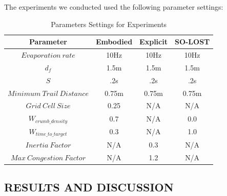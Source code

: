 \documentclass[letterpaper, 10 pt, conference]{ieeeconf}  %
\begin{document}
The experiments we conducted used the following parameter settings:

\begin{table}[ht]                                                              
  \begin{center}
    \begin{tabular}{|c|c|c|c|}                                                
    \hline
      Parameter & Embodied & Explicit & SO-LOST\\                                  
    \hline                                                                    
      $Evaporation\ rate$ & 10Hz & 10Hz & 10Hz\\ %
    \hline
      $d_f$ & 1.5m & 1.5m & 1.5m\\ %
    \hline
      $S$ & .2s & .2s & .2s\\ %
    \hline
      $Minimum\ Trail\ Distance$ & 0.75m & 0.75m & 0.75m\\ %
    \hline
      $Grid\ Cell\ Size$ & 0.25 & N/A & N/A\\ %
    \hline
      $W_{crumb\_density}$ & 0.7 & N/A & 0.0\\ %
    \hline
      $W_{time\_to\_target}$ & 0.3 & N/A & 1.0\\ %
    \hline
      $Inertia\ Factor$ & N/A & 0.3 & N/A\\ %
    \hline
      $Max\ Congestion\ Factor$ & N/A & 1.2 & N/A\\ %
    \hline
    \end{tabular}
   \caption{Parameters Settings for Experiments}                                
    \label{table:parameter_settings}
  \end{center}
\end{table}

\subsection{RESULTS AND DISCUSSION}
\end{document}
